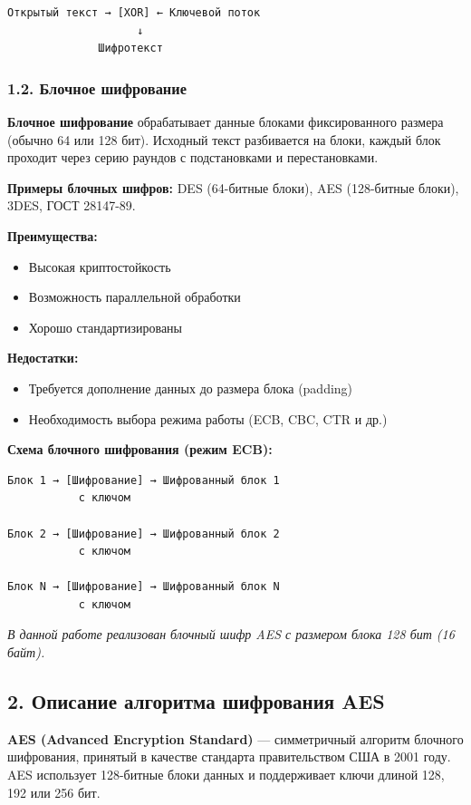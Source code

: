 \begin{verbatim}
Открытый текст → [XOR] ← Ключевой поток
                    ↓
              Шифротекст
\end{verbatim}

\subsubsection*{1.2. Блочное шифрование}

\textbf{Блочное шифрование} обрабатывает данные блоками фиксированного размера (обычно 64 или 128 бит). Исходный текст разбивается на блоки, каждый блок проходит через серию раундов с подстановками и перестановками.

\textbf{Примеры блочных шифров:} DES (64-битные блоки), AES (128-битные блоки), 3DES, ГОСТ 28147-89.

\textbf{Преимущества:}
\begin{itemize}
    \item Высокая криптостойкость
    \item Возможность параллельной обработки
    \item Хорошо стандартизированы
\end{itemize}

\textbf{Недостатки:}
\begin{itemize}
    \item Требуется дополнение данных до размера блока (padding)
    \item Необходимость выбора режима работы (ECB, CBC, CTR и др.)
\end{itemize}

\textbf{Схема блочного шифрования (режим ECB):}

\begin{verbatim}
Блок 1 → [Шифрование] → Шифрованный блок 1
           с ключом

Блок 2 → [Шифрование] → Шифрованный блок 2
           с ключом

Блок N → [Шифрование] → Шифрованный блок N
           с ключом
\end{verbatim}

\textit{В данной работе реализован блочный шифр AES с размером блока 128 бит (16 байт).}

\subsection*{2. Описание алгоритма шифрования AES}

\textbf{AES (Advanced Encryption Standard)} — симметричный алгоритм блочного шифрования, принятый в качестве стандарта правительством США в 2001 году. AES использует 128-битные блоки данных и поддерживает ключи длиной 128, 192 или 256 бит.

